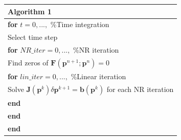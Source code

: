 \documentclass[review]{elsarticle}
\begin{document}
\begin{table}[!h]\centering
\begin{minipage}{1\textwidth}
\begin{tabular}{ |l| } 
\hline
\textbf{Algorithm 1}\\
\hline
\hline
\hspace{0.5cm}\textbf{for} $t=0,...,$    \hspace{52mm}    \%Time integration \\
\hspace{1cm} Select time step\\
\hspace{1cm}\textbf{for} $NR\_iter=0,...,$    \hspace{34mm}    \%NR iteration\\
 \hspace{1.5cm} Find zeros of $\mathbf{F}(\mathbf{p}^{n+1};\mathbf{p}^n)=0$\\
\hspace{1.5cm}\textbf{for} $lin\_iter=0,...,$    \hspace{31mm}    \%Linear iteration \\
\hspace{2cm}Solve $\mathbf{J}(\mathbf{p}^k)\delta \mathbf{p}^{k+1}=\mathbf{b}(\mathbf{p}^k)$ for each NR iteration\\
\hspace{1.5cm}\textbf{end}\\
\hspace{1cm}\textbf{end}\\
\hspace{0.5cm}\textbf{end}\\
\hline
\end{tabular}
\end{minipage}
\end{table}
\end{document}
